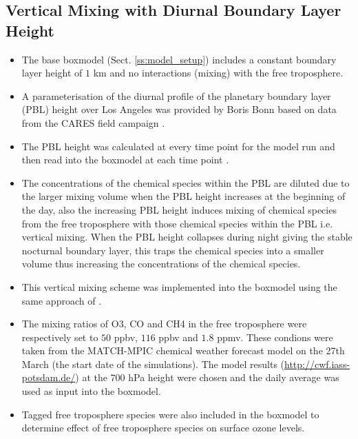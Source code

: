 \subsection{Vertical Mixing with Diurnal Boundary Layer Height} \label{ss:vertical_mixing}
\begin{itemize}
    \item The base boxmodel (Sect. \ref{ss:model_setup}) includes a constant boundary layer height of $1$ km and no interactions (mixing) with the free troposphere.
    \item A parameterisation of the diurnal profile of the planetary boundary layer (PBL) height over Los Angeles was provided by Boris Bonn based on data from the CARES field campaign \citep{CARES:2008} .
    \item The PBL height was calculated at every time point for the model run and then read into the boxmodel at each time point .
    \item The concentrations of the chemical species within the PBL are diluted due to the larger mixing volume when the PBL height increases at the beginning of the day, also the increasing PBL height induces mixing of chemical species from the free troposphere with those chemical species within the PBL i.e. vertical mixing. When the PBL height collapses during night giving the stable nocturnal boundary layer, this traps the chemical species into a smaller volume thus increasing the concentrations of the chemical species.
    \item This vertical mixing scheme was implemented into the boxmodel using the same approach of \citet{Lourens:2012}.
    \item The mixing ratios of O3, CO and CH4 in the free troposphere were respectively set to $50$ ppbv, $116$ ppbv and $1.8$ ppmv. These condions were taken from the MATCH-MPIC chemical weather forecast model on the 27th March (the start date of the simulations). The model results (\url{http://cwf.iass-potsdam.de/}) at the 700 hPa height were chosen and the daily average was used as input into the boxmodel. 
    \item Tagged free troposphere species were also included in the boxmodel to determine effect of free troposphere species on surface ozone levels.
\end{itemize}
